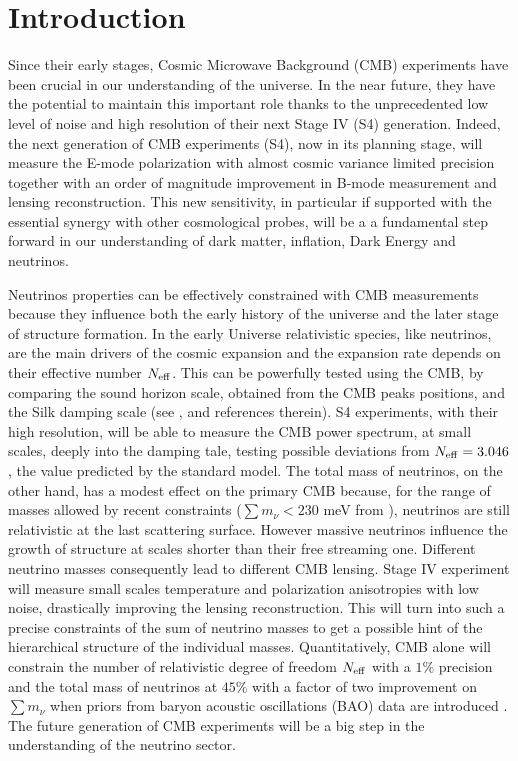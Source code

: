 \documentclass[aps,prd,reprint,superscriptaddress]{revtex4-1}
\begin{document}
\pacs{}
\maketitle

\section{Introduction}\label{sec:intro}
Since their early stages, Cosmic Microwave Background (CMB) experiments have been crucial in our understanding of the universe. In the near future, they have the potential to maintain this important role  thanks to the unprecedented low level of noise and high resolution of their next Stage IV (S4) generation. 
Indeed, the next generation of CMB experiments (S4), now in its planning stage, will measure the E-mode polarization with almost cosmic variance limited precision together with an order of magnitude improvement in B-mode measurement and lensing reconstruction.
This new sensitivity, in particular if supported with the essential synergy with other cosmological probes, will be a a fundamental step forward in our understanding of dark matter, inflation, Dark Energy and neutrinos. 

Neutrinos properties can be effectively constrained with CMB measurements because they influence both the early history of the universe and the later stage of structure formation. 
In the early Universe relativistic species, like neutrinos, are the main drivers of the cosmic expansion and the expansion rate depends on their effective number $N_{\rm eff}$. This can be powerfully tested using the CMB, by comparing the sound horizon scale, obtained from the CMB peaks positions, and the Silk damping scale (see \cite{2013arXiv1309.5383A}, \cite{2013PhRvD..87h3008H} and references therein). 
S4 experiments, with their high resolution, will be able to measure the CMB power spectrum, at small scales, deeply into the damping tale, testing  possible deviations from $N_{\rm eff}=3.046$, the value predicted by the standard model.
The total mass of neutrinos, on the other hand, has a modest effect on the primary CMB because, for the range of masses allowed by recent constraints ($\sum m_\nu<230$ meV from \cite{2014A&A...571A..16P}), neutrinos are still relativistic at the last scattering surface. However massive neutrinos influence the growth of structure at scales shorter than their free streaming one. Different neutrino masses consequently lead to different CMB lensing. Stage IV experiment will measure small scales temperature and polarization anisotropies with low noise, drastically improving the lensing reconstruction. This will turn into such a precise constraints of the sum of neutrino masses to get a possible hint of the hierarchical structure of the individual masses. 
Quantitatively, CMB alone will constrain the number of relativistic degree of freedom $N_{\rm eff}$ with a $1\%$ precision and the total mass of neutrinos at $45\%$ with a factor of two improvement on $\sum m_\nu$ when priors from baryon acoustic oscillations (BAO) data are introduced \cite{wu:2014}. The future generation of CMB experiments will be a big step in the understanding of the neutrino sector.
\end{document}

